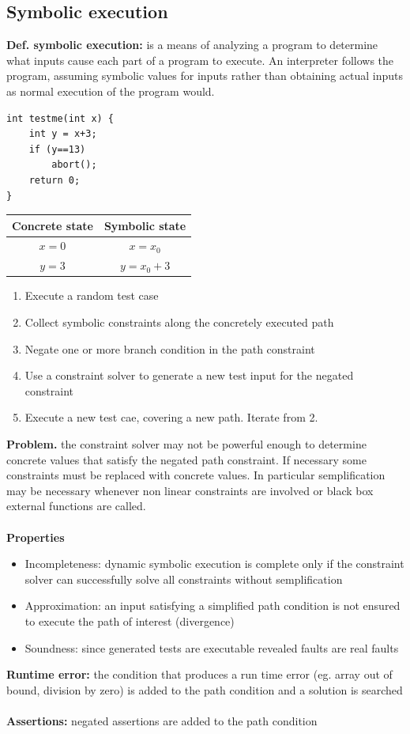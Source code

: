 \documentclass[10pt,a4paper]{article}
\begin{document}
\subsection{Symbolic execution}
\textbf{Def. symbolic execution:} is a means of analyzing a program to determine what inputs cause each part of a program to execute. An interpreter follows the program, assuming symbolic values for inputs rather than obtaining actual inputs as normal execution of the program would.
\begin{verbatim}
int testme(int x) {
	int y = x+3;
	if (y==13)
		abort();
	return 0;		
}
\end{verbatim}
\begin{center}
\begin{tabular}{|c|c|}
\hline 
Concrete state & Symbolic state \\ 
\hline 
$x=0$ & $x=x_0$ \\ 
\hline 
$y=3$ & $y=x_0+3$ \\ 
\hline 
\end{tabular} 
\end{center}
\begin{enumerate}
\item Execute a random test case
\item Collect symbolic constraints along the concretely executed path
\item Negate one or more branch condition in the path constraint
\item Use a constraint solver to generate a new test input for the negated constraint
\item Execute a new test cae, covering a new path. Iterate from 2.
\end{enumerate}
\textbf{Problem.} the constraint solver may not be powerful enough to determine concrete values that satisfy the negated path constraint. If necessary some constraints must be replaced with concrete values. In particular semplification may be necessary whenever non linear constraints  are involved or black box external functions are called.\\\\
\textbf{Properties}
\begin{itemize}
\item Incompleteness: dynamic symbolic execution is complete only if the constraint solver can successfully solve all constraints without semplification
\item Approximation: an input satisfying a simplified path condition is not ensured to execute the path of interest (divergence)
\item Soundness: since generated tests are executable revealed faults are real faults
\end{itemize}
\textbf{Runtime error:} the condition that produces a run time error (eg. array out of bound, division by zero) is added to the path condition and a solution is searched\\\\
\textbf{Assertions:} negated assertions are added to the path condition
\end{document}
